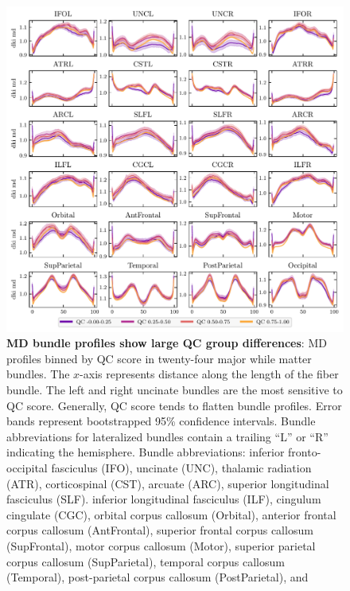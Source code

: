 \documentclass[9pt,lineno]{elife}
\begin{document}
\begin{figure}[tbp]
\begin{fullwidth}
    \centering
    \includegraphics[width=\linewidth]{bundle-profiles/qc-bins-dki-md.pdf}
    \caption{%
        {\bf MD bundle profiles show large QC group differences}:
        MD profiles binned by QC score in twenty-four major while matter
        bundles.  The $x$-axis represents distance along the length of the fiber
        bundle.
        The left and right uncinate bundles are the most sensitive
        to QC score. Generally, QC score tends to flatten bundle profiles.
        Error bands represent bootstrapped 95\% confidence intervals. Bundle
        abbreviations for lateralized bundles contain a trailing ``L'' or ``R''
        indicating the hemisphere. Bundle abbreviations:
        inferior fronto-occipital fasciculus (IFO),
        uncinate (UNC),
        thalamic radiation (ATR),
        corticospinal (CST),
        arcuate (ARC),
        superior longitudinal fasciculus (SLF).
        inferior longitudinal fasciculus (ILF),
        cingulum cingulate (CGC),
        orbital corpus callosum (Orbital),
        anterior frontal corpus callosum (AntFrontal),
        superior frontal corpus callosum (SupFrontal),
        motor corpus callosum (Motor),
        superior parietal corpus callosum (SupParietal),
        temporal corpus callosum (Temporal),
        post-parietal corpus callosum (PostParietal), and
}
\end{fullwidth}
\end{figure}
\end{document}
